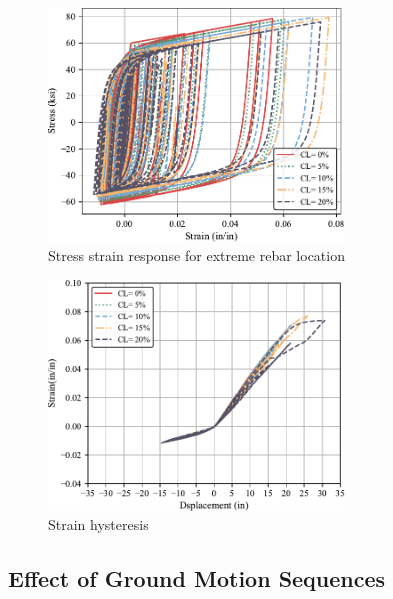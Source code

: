 \begin{figure}[htbp]
	\centering
	\includegraphics[width=0.7\textwidth]{Chapter-5/figs/Stress_Strain_RSN1505.pdf}
	\caption{Stress strain response for extreme rebar location}
	\label{fig:Steel_Stress_Strain_Response}
\end{figure}

\begin{figure}[htbp]
	\centering
	\includegraphics[width=0.7\textwidth]{Chapter-5/figs/Diplacement_Strain_RSN1505.pdf}
	\caption{Strain hysteresis}
	\label{fig:Steel_Strain_Response}
\end{figure}

\subsection{Effect of Ground Motion Sequences}

